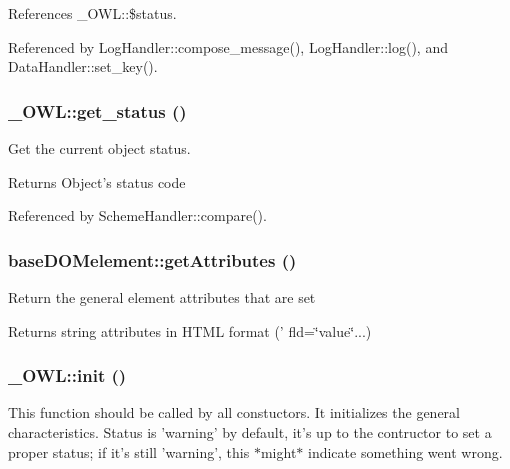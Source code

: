 References \_\-OWL::\$status.



Referenced by LogHandler::compose\_\-message(), LogHandler::log(), and DataHandler::set\_\-key().

\subsubsection[{get\_\-status}]{\setlength{\rightskip}{0pt plus 5cm}\_\-OWL::get\_\-status ()}\label{class__OWL_a99ec771fa2c5c279f80152cc09e489a8}
Get the current object status.

\begin{DoxyReturn}{Returns}
Object's status code 
\end{DoxyReturn}


Referenced by SchemeHandler::compare().

\subsubsection[{getAttributes}]{\setlength{\rightskip}{0pt plus 5cm}baseDOMelement::getAttributes ()}\label{classbaseDOMelement_a9456b7731b213110c600bd39705d9135}
Return the general element attributes that are set \begin{DoxyReturn}{Returns}
string attributes in HTML format (' fld=\char`\"{}value\char`\"{}...) 
\end{DoxyReturn}
\subsubsection[{init}]{\setlength{\rightskip}{0pt plus 5cm}\_\-OWL::init ()}\label{class__OWL_ae0ef3ded56e8a6b34b6461e5a721cd3e}
This function should be called by all constuctors. It initializes the general characteristics. Status is 'warning' by default, it's up to the contructor to set a proper status; if it's still 'warning', this $\ast$might$\ast$ indicate something went wrong. 


